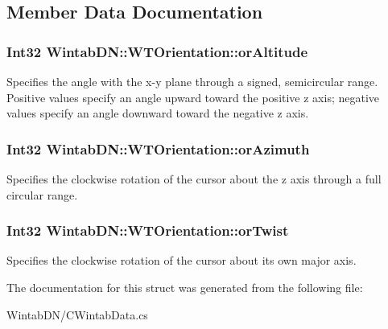 \subsection{Member Data Documentation}
\hypertarget{struct_wintab_d_n_1_1_w_t_orientation_a94182c4f6543a31161e16b2a684b954f}{
\subsubsection[{orAltitude}]{\setlength{\rightskip}{0pt plus 5cm}Int32 {\bf WintabDN::WTOrientation::orAltitude}}}
\label{struct_wintab_d_n_1_1_w_t_orientation_a94182c4f6543a31161e16b2a684b954f}


Specifies the angle with the x-\/y plane through a signed, semicircular range. Positive values specify an angle upward toward the positive z axis; negative values specify an angle downward toward the negative z axis. 

\hypertarget{struct_wintab_d_n_1_1_w_t_orientation_ae280f0ee6efa5399950862eb02710cb2}{
\subsubsection[{orAzimuth}]{\setlength{\rightskip}{0pt plus 5cm}Int32 {\bf WintabDN::WTOrientation::orAzimuth}}}
\label{struct_wintab_d_n_1_1_w_t_orientation_ae280f0ee6efa5399950862eb02710cb2}


Specifies the clockwise rotation of the cursor about the z axis through a full circular range. 

\hypertarget{struct_wintab_d_n_1_1_w_t_orientation_a685f37c134a39e615770809ab6706555}{
\subsubsection[{orTwist}]{\setlength{\rightskip}{0pt plus 5cm}Int32 {\bf WintabDN::WTOrientation::orTwist}}}
\label{struct_wintab_d_n_1_1_w_t_orientation_a685f37c134a39e615770809ab6706555}


Specifies the clockwise rotation of the cursor about its own major axis. 



The documentation for this struct was generated from the following file:\begin{DoxyCompactItemize}
\item 
WintabDN/CWintabData.cs\end{DoxyCompactItemize}

